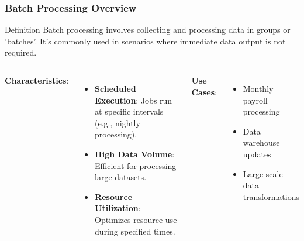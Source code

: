 \documentclass[aspectratio=169]{beamer}
\begin{document}
\begin{frame}[fragile]
    \frametitle{Batch Processing Overview}
    \begin{block}{Definition}
        Batch processing involves collecting and processing data in groups or 'batches'. It's commonly used in scenarios where immediate data output is not required.
    \end{block}
    
    \begin{columns}
            \textbf{Characteristics}:
            \begin{itemize}
                \item \textbf{Scheduled Execution}: Jobs run at specific intervals (e.g., nightly processing).
                \item \textbf{High Data Volume}: Efficient for processing large datasets.
                \item \textbf{Resource Utilization}: Optimizes resource use during specified times.
            \end{itemize}
        
            \textbf{Use Cases}:
            \begin{itemize}
                \item Monthly payroll processing
                \item Data warehouse updates
                \item Large-scale data transformations
            \end{itemize}
    \end{columns}
\end{frame}
\end{document}
